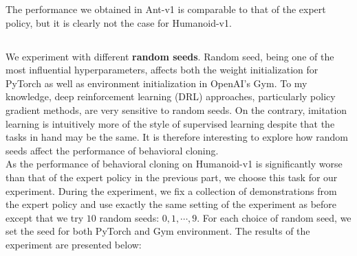 \documentclass[a4paper]{article}
\theoremstyle{definition}
\begin{document}
\bigskip
The performance we obtained in Ant-v1 is comparable to that of the expert policy, but it is clearly not the case for Humanoid-v1. 

\subsection{}

We experiment with different \textbf{random seeds}. Random seed, being one of the most influential hyperparameters, affects both the weight initialization for PyTorch as well as environment initialization in OpenAI's Gym. To my knowledge, deep reinforcement learning (DRL) approaches, particularly policy gradient methods, are very sensitive to random seeds. On the contrary, imitation learning is intuitively more of the style of supervised learning despite that the tasks in hand may be the same. It is therefore interesting to explore how random seeds affect the performance of behavioral cloning.\\

As the performance of behavioral cloning on Humanoid-v1 is significantly worse than that of the expert policy in the previous part, we choose this task for our experiment. During the experiment, we fix a collection of demonstrations from the expert policy and use exactly the same setting of the experiment as before except that we try $10$ random seeds: $0, 1,\cdots,9$. For each choice of random seed, we set the seed for both PyTorch and Gym environment. The results of the experiment are presented below:
\end{document}

